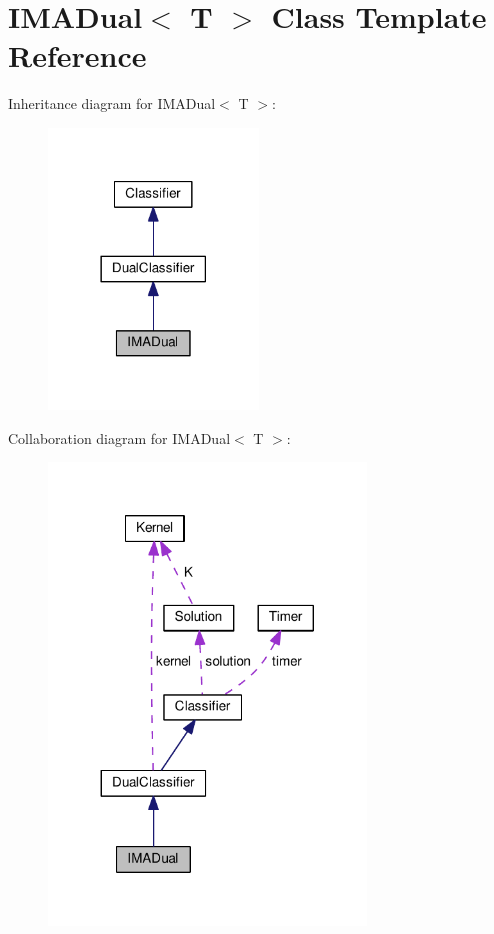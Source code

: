 \hypertarget{class_i_m_a_dual}{}\section{I\+M\+A\+Dual$<$ T $>$ Class Template Reference}
\label{class_i_m_a_dual}


Inheritance diagram for I\+M\+A\+Dual$<$ T $>$\+:\nopagebreak
\begin{figure}[H]
\begin{center}
\leavevmode
\includegraphics[width=158pt]{class_i_m_a_dual__inherit__graph}
\end{center}
\end{figure}


Collaboration diagram for I\+M\+A\+Dual$<$ T $>$\+:\nopagebreak
\begin{figure}[H]
\begin{center}
\leavevmode
\includegraphics[width=239pt]{class_i_m_a_dual__coll__graph}
\end{center}
\end{figure}
